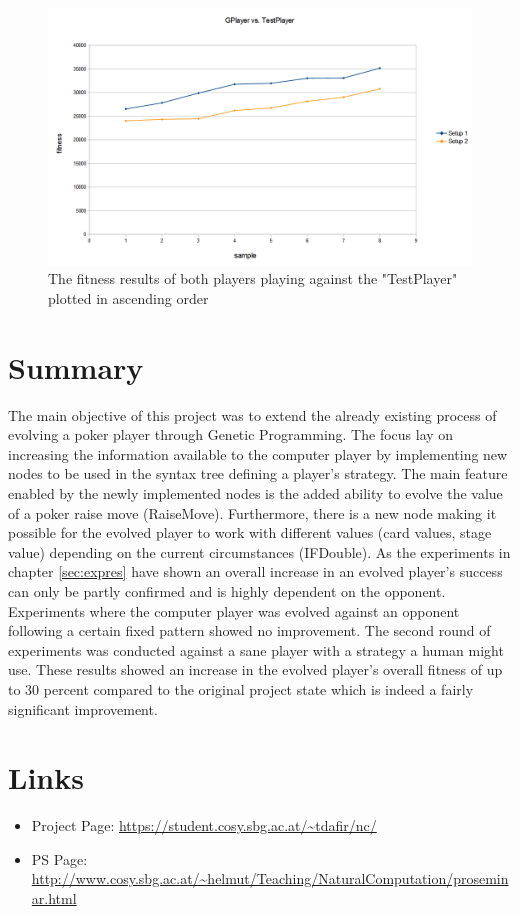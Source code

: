 \documentclass[12pt,fleqn,a4paper]{article}
\begin{document}
\begin{figure}[!h]
	\begin{center}
		\includegraphics[width=.7\textwidth]{gp_vs_tp_new.png}
		\caption{The fitness results of both players playing against the "TestPlayer" plotted in ascending order}
	\end{center}
\end{figure}

\section{Summary}
The main objective of this project was to extend the already existing process of evolving a poker player through Genetic Programming. The focus lay on increasing the information available to the computer player by implementing new nodes to be used in the syntax tree defining a player's strategy. The main feature enabled by the newly implemented nodes is the added ability to evolve the value of a poker raise move (RaiseMove). Furthermore, there is a new node making it possible for the evolved player to work with different values (card values, stage value) depending on the current circumstances (IFDouble).
As the experiments in chapter \ref{sec:expres} have shown an overall increase in an evolved player's success can only be partly confirmed and is highly dependent on the opponent. Experiments where the computer player was evolved against an opponent following a certain fixed pattern showed no improvement. The second round of experiments was conducted against a sane player with a strategy a human might use. These results showed an increase in the evolved player's overall fitness of up to 30 percent compared to the original project state which is indeed a fairly significant improvement.


\newpage
\section{Links}

\begin{itemize}
\item Project Page: \url{https://student.cosy.sbg.ac.at/~tdafir/nc/}
\item PS Page:
\url{http://www.cosy.sbg.ac.at/~helmut/Teaching/NaturalComputation/proseminar.html}

\end{itemize}

\nocite{*}

\end{document}
